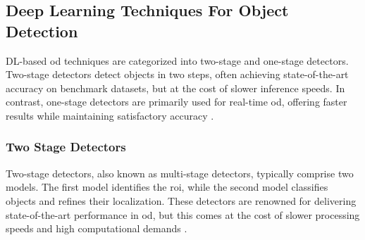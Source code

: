 \subsection{Deep Learning Techniques For Object Detection}
DL-based \gls{od} techniques are categorized into two-stage and one-stage detectors. Two-stage detectors detect objects in two steps, often achieving state-of-the-art accuracy on benchmark datasets, but at the cost of slower inference speeds. In contrast, one-stage detectors are primarily used for real-time \gls{od}, offering faster results while maintaining satisfactory accuracy \cite{oD_Review}.

\subsubsection{Two Stage Detectors}
Two-stage detectors, also known as multi-stage detectors, typically comprise two models. The first model identifies the \gls{roi}, while the second model classifies objects and refines their localization. These detectors are renowned for delivering state-of-the-art performance in \gls{od}, but this comes at the cost of slower processing speeds and high computational demands \cite{oD_Review}.

